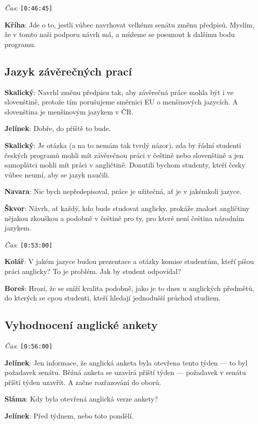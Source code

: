 \documentclass[a4paper,10pt,notitlepage]{article}
\newcommand{\ts}[1]{\texttt{[#1]}}
\newcommand{\tsp}[1]{\noindent \textit{Čas}: \ts{#1}}
\newcommand{\cl}[1]{\noindent \textbf{#1}:}
\begin{document}
\tsp{0:46:45}

\cl{Kříha} Jde o to, jestli vůbec navrhovat velkému senátu změnu předpisů. Myslím, že v tomto naši podporu návrh má, a můžeme se posunout k dalšímu bodu programu.

\subsection{Jazyk závěrečných prací}

\cl{Skalický} Navrhl změnu předpisu tak, aby závěrečná práce mohla být i ve slovenštině, protože tím porušujeme směrnici EU o menšinových jazycích. A slovenština je menšinovým jazykem v ČR.

\cl{Jelínek} Dobře, do příště to bude.

\cl{Skalický} Je otázka (a na to nemám tak tvrdý názor), zda by řádní studenti českých programů mohli mít závěrečnou práci v češtině nebo slovenštině a jen samoplátci mohli mít práci v angličtině. Donutili bychom studenty, kteří česky vůbec neumí, aby se jazyk naučili.

\cl{Navara} Nic bych nepředepisoval, práce je užitečná, ať je v jakémkoli jazyce.

\cl{Škvor} Návrh, ať každý, kdo bude studovat anglicky, prokáže znalost angličtiny nějakou zkouškou a podobně v češtině pro ty, pro které není čeština národním jazykem.

\tsp{0:53:00}

\cl{Kolář} V jakém jazyce budou prezentace a otázky komise studentům, kteří píšou práci anglicky? To je problém. Jak by student odpovídal?

\cl{Boreš} Hrozí, že se sníží kvalita podobně, jako je to dnes u anglických předmětů, do kterých se cpou studenti, kteří hledají jednodušší průchod studiem.

\subsection{Vyhodnocení anglické ankety}

\tsp{0:56:00}


\cl{Jelínek} Jen informace, že anglická anketa byla otevřena tento týden --- to byl požadavek senátu. Běźná anketa se uzavírá příští týden --- požadavek v senátu příští týden uzavřít. A začne rozřazování do oborů.

\cl{Sláma} Kdy byla otevřená anglická verze ankety?

\cl{Jelínek} Před týdnem, nebo toto pondělí.
\end{document}

